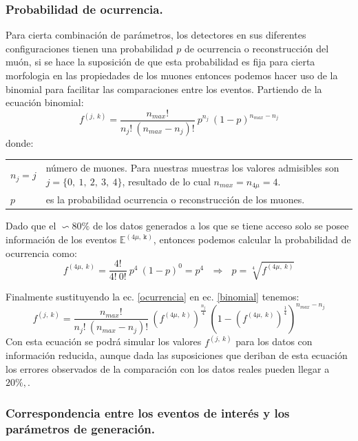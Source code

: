 \subsubsection{Probabilidad de ocurrencia.}

Para cierta combinación de parámetros, los detectores en sus diferentes configuraciones tienen una probabilidad $p$ de ocurrencia o reconstrucción del muón, si se hace la suposición de que esta probabilidad es fija para cierta morfologia en las propiedades de los muones entonces podemos hacer uso de la binomial para facilitar las comparaciones entre los eventos.
Partiendo de la ecuación binomial:
\begin{equation}\label{binomial}
f^{(j,~k)} = \dfrac{n_{max}!}{n_j!~(n_{max} - n_j)!} ~ p^{n_j} ~ (1-p)^{n_{max}-n_j}
\end{equation}
donde:\\
\begin{tabular}{lp{14cm}}
$n_{j} = j$ & número de muones. Para nuestras muestras los valores admisibles son $j = \{0,~1,~2,~3,~4\}$, resultado de lo cual $n_{max} = n_{4\mu} = 4$. \\
$p$ & es la probabilidad ocurrencia o reconstrucción de los muones.
\end{tabular}
Dado que el $\backsim 80\%$ de los datos generados a los que se tiene acceso solo se posee información de los eventos $\mathbb{E}^{(4\mu,~\mathtt{k})}$, entonces podemos calcular la probabilidad de ocurrencia como:
\begin{equation}\label{ocurrencia}
f^{(4\mu,~k)} = \dfrac{4!}{4!~0!} ~ p^{4} ~ (1-p)^{0} = p^{4} ~~~\Rightarrow ~~~ p = \sqrt[4]{f^{(4\mu,~k)}}
\end{equation}

Finalmente sustituyendo la ec. \ref{ocurrencia} en ec. \ref{binomial} tenemos:
\begin{equation}\label{binomialF}
f^{(j,~k)} = \dfrac{n_{max}!}{n_j!~(n_{max} - n_j)!} ~ (f^{(4\mu,~k)})^{\frac{n_j}{4}} ~ (1-(f^{(4\mu,~k)})^{\frac{1}{4}})^{n_{max}-n_j}
\end{equation}
Con esta ecuación se podrá simular los valores $f^{(j,~k)}$ para los datos con información reducida, aunque dada las suposiciones que deriban de esta ecuación los errores observados de la comparación con los datos reales pueden llegar a $20\%
,$.%



\subsubsection{Correspondencia entre los eventos de interés y los parámetros de generación.}

